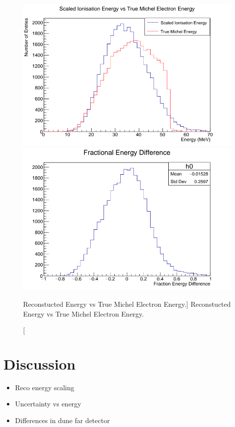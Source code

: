 \begin{figure}
	\centering
	\includegraphics[width=\textwidth]{figures/reco_v_mich.png}
	\includegraphics[width=\textwidth]{figures/reco_v_mich_delta.png}
	\caption
	[Reconstucted Energy vs True Michel Electron Energy.]
	{Reconstucted Energy vs True Michel Electron Energy.}
	\label{fig:reco_v_mich}
\end{figure}

\section{Discussion} \label{ME_EU}
\begin{mccorrection}
	\begin{itemize}
		\item Reco energy scaling
		\item Uncertainty vs energy
		\item Differences in dune far detector
	\end{itemize}
\end{mccorrection}
